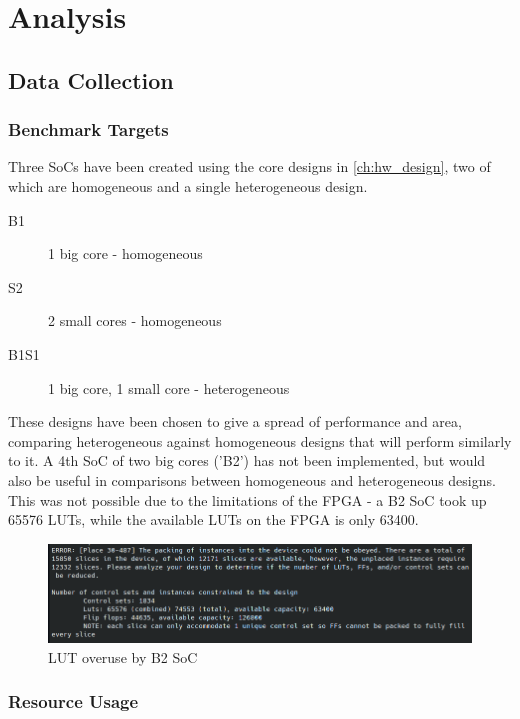 \chapter{Analysis}
\label{ch:analysis}
\section{Data Collection}
\subsection{Benchmark Targets} %
Three SoCs have been created using the core designs in \ref{ch:hw_design}, two of which are homogeneous and a single heterogeneous design.

\begin{description}
    \item[B1] 1 big core - homogeneous
    \item[S2] 2 small cores - homogeneous
    \item[B1S1] 1 big core, 1 small core - heterogeneous
\end{description}

These designs have been chosen to give a spread of performance and area, comparing heterogeneous against homogeneous designs that will perform similarly to it. A 4th SoC of two big cores ('B2') has not been implemented, but would also be useful in comparisons between homogeneous and heterogeneous designs. This was not possible due to the limitations of the FPGA - a B2 SoC took up 65576 LUTs, while the available LUTs on the FPGA is only 63400.

\begin{figure}[h!]
    \centering
    \includegraphics*[width=\textwidth]{img/B2_lut_overuse.png}
    \caption{LUT overuse by B2 SoC}
    \label{fig:B2_lut_overuse}
\end{figure}

\subsection{Resource Usage}
